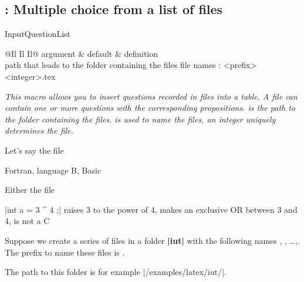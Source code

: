 \subsection{ : Multiple choice from a list of files}

\begin{NewMacroBox}{InputQuestionList}{}

\begin{tabular}{@{}Il Il Il@{}}  \toprule \thead
  argument                 & default & definition                    \\ \midrule
  \tbody
{}  {}  {path that leads to the folder containing the files}         {} {file names  : <prefix><integer>.tex}          
\bottomrule
 \end{tabular}
  
  \medskip  
\emph{This macro allows you to insert questions recorded in files into a table. A file can contain one or more questions with the corresponding propositions.  is the path to the folder containing the files.  is used to name the files, an integer uniquely determines the file.}

\end{NewMacroBox}

Let's say the file 

\begin{tkzltxexample}[]
{{Fortran},
 {language B},
 {Basic}}
\end{tkzltxexample}

\medskip
Either the file 

\begin{tkzltxexample}[]
\verbdef\argprop|int a = 3 ^ 4 ;|
\AQquestion{\argprop}
{{raises 3 to the power of 4},
 {makes an exclusive OR between 3 and 4},
 {is not a C}}
\end{tkzltxexample}

\bigskip
Suppose we create a series of files in a folder \textbf{|iut|} with the following names \newline
 , , \ldots ,. The prefix to name these files is .

The path to this folder is for example 
|/examples/latex/iut/|.

